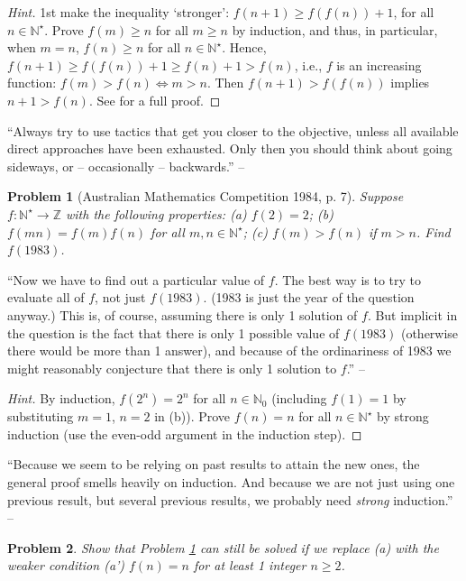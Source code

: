 \documentclass[oneside]{book}
\numberwithin{equation}{section}
\newtheorem{problem}{Problem}[section]
\begin{document}
\begin{proof}[Hint]
	1st make the inequality `stronger': $f(n + 1)\ge f(f(n)) + 1$, for all $n\in\mathbb{N}^\star$. Prove $f(m)\ge n$ for all $m\ge n$ by induction, and thus, in particular, when $m = n$, $f(n)\ge n$ for all $n\in\mathbb{N}^\star$. Hence, $f(n + 1)\ge f(f(n)) + 1\ge f(n) + 1 > f(n)$, i.e., $f$ is an increasing function: $f(m) > f(n)\Leftrightarrow m > n$. Then $f(n + 1) > f(f(n))$ implies $n + 1 > f(n)$. See \cite[pp. 36--38]{Tao2006} for a full proof.
\end{proof}
``Always try to use tactics that get you closer to the objective, unless all available direct approaches have been exhausted. Only then you should think about going sideways, or -- occasionally -- backwards.'' -- \cite[p. 37]{Tao2006}

\begin{problem}[Australian Mathematics Competition 1984, p. 7]
	\label{prob: Australian Mathematics Competition 1984, p. 7}
	Suppose $f:\mathbb{N}^\star\to\mathbb{Z}$ with the following properties: (a) $f(2) = 2$; (b) $f(mn) = f(m)f(n)$ for all $m,n\in\mathbb{N}^\star$; (c) $f(m) > f(n)$ if $m > n$. Find $f(1983)$.
\end{problem}
``Now we have to find out a particular value of $f$. The best way is to try to evaluate all of $f$, not just $f(1983)$. (1983 is just the year of the question anyway.) This is, of course, assuming there is only 1 solution of $f$. But implicit in the question is the fact that there is only 1 possible value of $f(1983)$ (otherwise there would be more than 1 answer), and because of the ordinariness of 1983 we might reasonably conjecture that there is only 1 solution to $f$.'' -- \cite[p. 39]{Tao2006}

\begin{proof}[Hint]
	By induction, $f(2^n) = 2^n$ for all $n\in\mathbb{N}_0$ (including $f(1) = 1$ by substituting $m = 1$, $n = 2$ in (b)). Prove $f(n) = n$ for all $n\in\mathbb{N}^\star$ by strong induction (use the even-odd argument in the induction step). 
\end{proof}
``Because we seem to be relying on past results to attain the new ones, the general proof smells heavily on induction. And because we are not just using one previous result, but several previous results, we probably need \textit{strong} induction.'' -- \cite[p. 40]{Tao2006}

\begin{problem}
	Show that Problem \ref{prob: Australian Mathematics Competition 1984, p. 7} can still be solved if we replace (a) with the weaker condition (a') $f(n) = n$ for at least 1 integer $n\ge 2$.
\end{problem}
\end{document}

